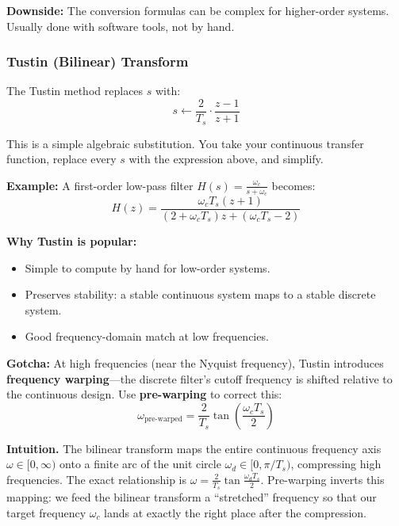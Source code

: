 \textbf{Downside:} The conversion formulas can be complex for higher-order systems. Usually done with software tools, not by hand.

\subsubsection{Tustin (Bilinear) Transform}

The Tustin method replaces $s$ with:
\begin{equation}
s \leftarrow \frac{2}{T_s} \cdot \frac{z - 1}{z + 1}
\end{equation}

This is a simple algebraic substitution. You take your continuous transfer function, replace every $s$ with the expression above, and simplify.

\textbf{Example:} A first-order low-pass filter $H(s) = \frac{\omega_c}{s + \omega_c}$ becomes:
\begin{equation}
H(z) = \frac{\omega_c T_s (z + 1)}{(2 + \omega_c T_s) z + (\omega_c T_s - 2)}
\end{equation}

\textbf{Why Tustin is popular:}
\begin{itemize}
    \item Simple to compute by hand for low-order systems.
    \item Preserves stability: a stable continuous system maps to a stable discrete system.
    \item Good frequency-domain match at low frequencies.
\end{itemize}

\textbf{Gotcha:} At high frequencies (near the Nyquist frequency), Tustin introduces \textbf{frequency warping}---the discrete filter's cutoff frequency is shifted relative to the continuous design. Use \textbf{pre-warping} to correct this:
\begin{equation}
\omega_{\text{pre-warped}} = \frac{2}{T_s} \tan\left(\frac{\omega_c T_s}{2}\right)
\end{equation}

\textbf{Intuition.} The bilinear transform maps the entire continuous frequency axis $\omega \in [0, \infty)$ onto a finite arc of the unit circle $\omega_d \in [0, \pi/T_s)$, compressing high frequencies. The exact relationship is $\omega = \frac{2}{T_s}\tan\frac{\omega_d T_s}{2}$. Pre-warping inverts this mapping: we feed the bilinear transform a ``stretched'' frequency so that our target frequency $\omega_c$ lands at exactly the right place after the compression.

